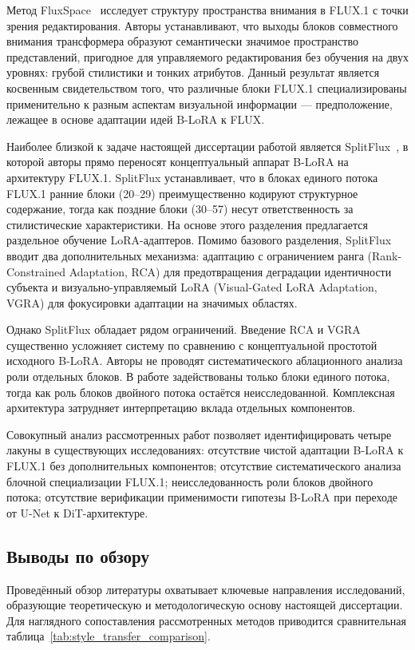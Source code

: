 Метод FluxSpace~\cite{dalva2024fluxspace} исследует структуру пространства внимания в FLUX.1 с точки зрения редактирования. Авторы устанавливают, что выходы блоков совместного внимания трансформера образуют семантически значимое пространство представлений, пригодное для управляемого редактирования без обучения на двух уровнях: грубой стилистики и тонких атрибутов. Данный результат является косвенным свидетельством того, что различные блоки FLUX.1 специализированы применительно к разным аспектам визуальной информации --- предположение, лежащее в основе адаптации идей B-LoRA к FLUX.

Наиболее близкой к задаче настоящей диссертации работой является SplitFlux~\cite{yang2025splitflux}, в которой авторы прямо переносят концептуальный аппарат B-LoRA на архитектуру FLUX.1. SplitFlux устанавливает, что в блоках единого потока FLUX.1 ранние блоки (20--29) преимущественно кодируют структурное содержание, тогда как поздние блоки (30--57) несут ответственность за стилистические характеристики. На основе этого разделения предлагается раздельное обучение LoRA-адаптеров. Помимо базового разделения, SplitFlux вводит два дополнительных механизма: адаптацию с ограничением ранга (Rank-Constrained Adaptation, RCA) для предотвращения деградации идентичности субъекта и визуально-управляемый LoRA (Visual-Gated LoRA Adaptation, VGRA) для фокусировки адаптации на значимых областях.

Однако SplitFlux обладает рядом ограничений. Введение RCA и VGRA существенно усложняет систему по сравнению с концептуальной простотой исходного B-LoRA. Авторы не проводят систематического аблационного анализа роли отдельных блоков. В работе задействованы только блоки единого потока, тогда как роль блоков двойного потока остаётся неисследованной. Комплексная архитектура затрудняет интерпретацию вклада отдельных компонентов.

Совокупный анализ рассмотренных работ позволяет идентифицировать четыре лакуны в существующих исследованиях: отсутствие чистой адаптации B-LoRA к FLUX.1 без дополнительных компонентов; отсутствие систематического анализа блочной специализации FLUX.1; неисследованность роли блоков двойного потока; отсутствие верификации применимости гипотезы B-LoRA при переходе от U-Net к DiT-архитектуре.


\subsection{Выводы по обзору}

Проведённый обзор литературы охватывает ключевые направления исследований, образующие теоретическую и методологическую основу настоящей диссертации. Для наглядного сопоставления рассмотренных методов приводится сравнительная таблица~\ref{tab:style_transfer_comparison}.

